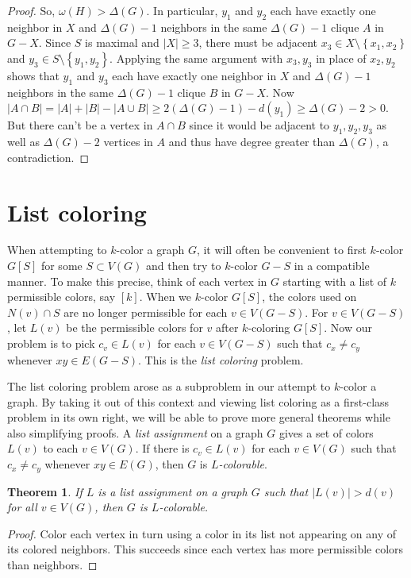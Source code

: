 \documentclass{tufte-book} %
\theoremstyle{plain}
\newtheorem{theorem}{Theorem}
\newcommand{\set}[1]{\left\{ #1 \right\}}
\newcommand{\card}[1]{\left|#1\right|}
\newcommand{\irange}[1]{\left[#1\right]}
\begin{document}
\begin{proof}
So, $\omega(H) > \Delta(G)$.  In particular, $y_1$ and $y_2$ each have exactly one neighbor in $X$ and $\Delta(G) - 1$ neighbors in the same $\Delta(G) -1$ clique $A$ in $G - X$.
 Since $S$ is maximal and $\card{X} \ge 3$, there must be adjacent
$x_3 \in X \setminus \set{x_1,x_2}$ and $y_3 \in S \setminus \set{y_1,y_2}$.  Applying the same argument with $x_3, y_3$ in place of $x_2, y_2$ shows
that $y_1$ and $y_3$ each have exactly one neighbor in $X$ and $\Delta(G) - 1$ neighbors in the same $\Delta(G) -1$ clique $B$ in $G - X$.
Now $\card{A\cap B} = \card{A} + \card{B} - \card{A\cup B} \ge 2(\Delta(G) - 1) - d(y_1) \ge \Delta(G) - 2 > 0$.  But there can't be a vertex
in $A \cap B$ since it would be adjacent to $y_1,y_2,y_3$ as well as $\Delta(G) - 2$ vertices in $A$ and thus have degree greater than $\Delta(G)$, a contradiction. 
\end{proof}

\section{List coloring}
When attempting to $k$-color a graph $G$, it will often be convenient to first $k$-color $G[S]$ for some $S \subset V(G)$ and then try to 
$k$-color $G-S$ in a compatible manner. To make this precise, think of each vertex in $G$ starting with a list of $k$ permissible colors, say $\irange{k}$.
When we $k$-color $G[S]$, the colors used on $N(v) \cap S$ are no longer permissible for each $v \in V(G-S)$.  For $v \in V(G-S)$, let $L(v)$ be the permissible colors
for $v$ after $k$-coloring $G[S]$.  Now our problem is to pick $c_v \in L(v)$ for each $v \in V(G-S)$ such that $c_x \ne c_y$ whenever $xy \in E(G-S)$.  This is the
\emph{list coloring} problem.

The list coloring problem arose as a subproblem in our attempt to $k$-color a graph.  By taking it out of this context and viewing list coloring as a first-class problem in its own
right, we will be able to prove more general theorems while also simplifying proofs.  A \emph{list assignment} on a graph $G$ gives a set of colors $L(v)$ to each $v \in V(G)$.  
If there is $c_v \in L(v)$ for each $v \in V(G)$ such that $c_x \ne c_y$ whenever $xy \in E(G)$, then $G$ is \emph{$L$-colorable}.

\begin{theorem}\label{FirstListBound}
If $L$ is a list assignment on a graph $G$ such that $\card{L(v)} > d(v)$ for all $v \in V(G)$, then $G$ is $L$-colorable.
\end{theorem}
\begin{proof}
Color each vertex in turn using a color in its list not appearing on any of its colored neighbors.  
This succeeds since each vertex has more permissible colors than neighbors.
\end{proof}
\end{document}
